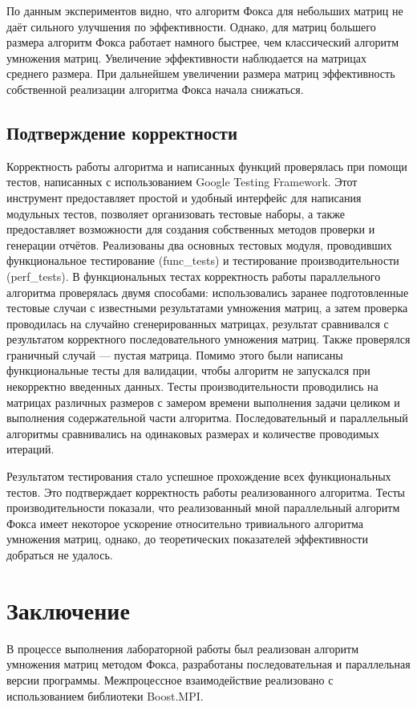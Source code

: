\documentclass{report}
\begin{document}
\par По данным экспериментов видно, что алгоритм Фокса для небольших матриц не даёт сильного улучшения по эффективности. Однако, для матриц большего размера алгоритм Фокса работает намного быстрее, чем классический алгоритм умножения матриц. Увеличение эффективности наблюдается на матрицах среднего размера. При дальнейшем увеличении размера матриц эффективность собственной реализации алгоритма Фокса начала снижаться. 
\subsection*{Подтверждение корректности}
Корректность работы алгоритма и написанных функций проверялась при помощи тестов, написанных с использованием Google Testing Framework. Этот инструмент предоставляет простой и удобный интерфейс для написания модульных тестов, позволяет организовать тестовые наборы, а также предоставляет возможности для создания собственных методов проверки и генерации отчётов. Реализованы два основных тестовых модуля, проводивших функциональное тестирование (func\_tests) и тестирование производительности (perf\_tests). В функциональных тестах корректность работы параллельного алгоритма проверялась двумя способами: использовались заранее подготовленные тестовые случаи с известными результатами умножения матриц, а затем проверка проводилась на случайно сгенерированных матрицах, результат сравнивался с результатом корректного последовательного умножения матриц. Также проверялся граничный случай --- пустая матрица. Помимо этого были написаны функциональные тесты для валидации, чтобы алгоритм не запускался при некорректно введенных данных. Тесты производительности проводились на матрицах различных размеров с замером времени выполнения задачи целиком и выполнения содержательной части алгоритма. Последовательный и параллельный алгоритмы сравнивались на одинаковых размерах и количестве проводимых итераций. 

Результатом тестирования стало успешное прохождение всех функциональных тестов. Это подтверждает корректность работы реализованного алгоритма. Тесты производительности показали, что реализованный мной параллельный алгоритм Фокса имеет некоторое ускорение относительно тривиального алгоритма умножения матриц, однако, до теоретических показателей эффективности добраться не удалось.
\clearpage

\section*{Заключение}
В процессе выполнения лабораторной работы был реализован алгоритм умножения матриц методом Фокса, разработаны последовательная и параллельная версии программы. Межпроцессное взаимодействие реализовано с использованием библиотеки Boost.MPI.
\end{document}
